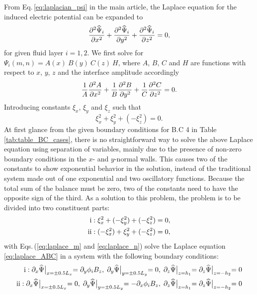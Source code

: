 \documentclass[aps,prfluids,reprint,superscriptaddress]{revtex4-2}
\newcommand{\noi}{\noindent}
\newcommand{\RN}[1]{%
	\textup{\uppercase\expandafter{\romannumeral#1}}%
}
\newcommand{\meqref}[1]{{\hypersetup{linkcolor=black}\eqref{#1}}}
\numberwithin{equation}{section}
\begin{document}
\noi From Eq.\,\meqref{eq:laplacian_psi} in the main article, the Laplace equation for the induced electric potential can be expanded to
\begin{gather}
	\pdv[2]{\widehat{\Psi}_i}{x} + \pdv[2]{\widehat{\Psi}_i}{y}
	+ \pdv[2]{\widehat{\Psi}_i}{z}= 0 ,
\end{gather}
for given fluid layer $i=1,2$. We first solve for $\Psi_i(m,n) = A(x) \: B(y) \: C(z) \: H$, where $A$, $B$, $C$ and $H$ are functions with respect to $x$, $y$, $z$ and the interface amplitude accordingly
\begin{equation}
	\dfrac{1}{A} \dpdv[2]{A}{x}  + \dfrac{1}{B} \dpdv[2]{B}{y} 
	+ \dfrac{1}{C} \dpdv[2]{C}{z} = 0.
	\label{eq:laplace_ABC}
\end{equation}
Introducing constants $\xi_x$, $\xi_y$ and $\xi_z$ such that
\begin{equation}
	\xi_x^2 + \xi_y^2 + (-\xi_z^2) = 0 .
\end{equation}
At first glance from the given boundary conditions for B.C 4 in Table\,\ref{tab:table_BC_cases}, there is no straightforward way to solve the above Laplace equation using separation of variables, mainly due to the presence of non-zero boundary conditions in the $x$- and $y$-normal walls. This causes two of the constants to show exponential behavior in the solution, instead of the traditional system made out of one exponential and two oscillatory functions. Because the total sum of the balance must be zero, two of the constants need to have the opposite sign of the third. As a solution to this problem, the problem is to be divided into two constituent parts:
\begin{subequations}
	\begin{align}
	\RN{1} : \xi_x^2 + (-\xi_y^2) + (-\xi_z^2) = 0,
	\label{eq:laplace_m} 
	\\
	\RN{2} : (-\xi_x^2) + \xi_y^2 + (-\xi_z^2) = 0,
	\label{eq:laplace_n} 
	\end{align}
\end{subequations}
with Eqs.\,(\ref{eq:laplace_m} and \ref{eq:laplace_n}) solve the Laplace equation \eqref{eq:laplace_ABC} in a system with the following boundary conditions:
\begin{subequations}
	\begin{align}
		\RN{1} : \partial_x \widehat\Psi\bigl|_{x=\pm 0.5L_x} = \partial_y\phi_i B_z,\;
		\partial_y \widehat\Psi\bigl|_{y=\pm 0.5L_y}= 0, \;
		\partial_z\widehat\Psi\bigl|_{z=h_1}=\partial_z\widehat\Psi\bigl|_{z=-h_2}=0
		\label{eq:bc_m} 
		\\
		\RN{2} : \partial_x \widehat\Psi\bigl|_{x=\pm 0.5L_x} = 0, \;
		\partial_y \widehat\Psi\bigl|_{y=\pm 0.5L_y}= -\partial_x\phi_i B_z,\;
		\partial_z\widehat\Psi\bigl|_{z=h_1}=\partial_z\widehat\Psi\bigl|_{z=-h_2}=0
		\label{eq:bc_n} 
	\end{align}
\end{subequations}
\end{document}

